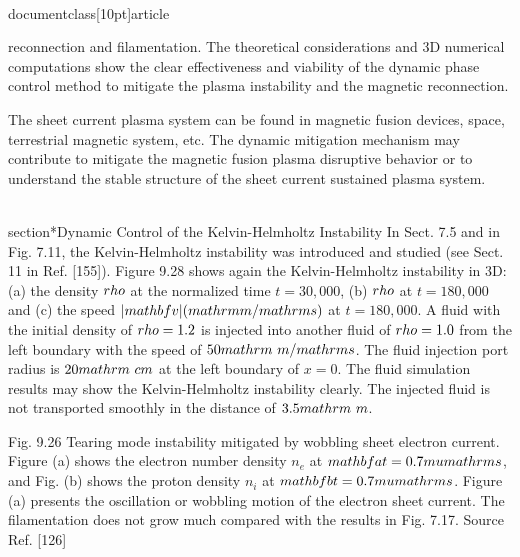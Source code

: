\\documentclass[10pt]{article}
\begin{document}
{{{{{{reconnection and filamentation. The theoretical considerations and 3D numerical computations show the clear effectiveness and viability of the dynamic phase control method to mitigate the plasma instability and the magnetic reconnection.

The sheet current plasma system can be found in magnetic fusion devices, space, terrestrial magnetic system, etc. The dynamic mitigation mechanism may contribute to mitigate the magnetic fusion plasma disruptive behavior or to understand the stable structure of the sheet current sustained plasma system.

\\section*{Dynamic Control of the Kelvin-Helmholtz Instability}
In Sect. 7.5 and in Fig. 7.11, the Kelvin-Helmholtz instability was introduced and studied (see Sect. 11 in Ref. [155]). Figure 9.28 shows again the Kelvin-Helmholtz instability in 3D: (a) the density $\\rho$ at the normalized time $t=30,000$, (b) $\\rho$ at $t=180,000$ and (c) the speed $|\\mathbf{v}|(\\mathrm{m} / \\mathrm{s})$ at $t=180,000$. A fluid with the initial density of $\\rho=1.2$ is injected into another fluid of $\\rho=1.0$ from the left boundary with the speed of $50 \\mathrm{~m} / \\mathrm{s}$. The fluid injection port radius is $20 \\mathrm{~cm}$ at the left boundary of $x=0$. The fluid simulation results may show the Kelvin-Helmholtz instability clearly. The injected fluid is not transported smoothly in the distance of $3.5 \\mathrm{~m}$.

Fig. 9.26 Tearing mode instability mitigated by wobbling sheet electron current. Figure (a) shows the electron number density $n_{e}$ at $\\mathbf{a} t=0.7 \\mu \\mathrm{s}$, and Fig. (b) shows the proton density $n_{i}$ at $\\mathbf{b} t=0.7 \\mu \\mathrm{s}$. Figure (a) presents the oscillation or wobbling motion of the electron sheet current. The filamentation does not grow much compared with the results in Fig. 7.17. Source Ref. [126]

}}}}}}
\end{document}

